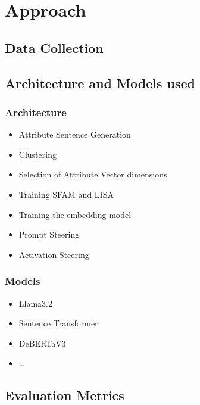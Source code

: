 \chapter{Approach}
\label{sec:approach}


\section{Data Collection}
\label{sec:approach:dataCollection}


\section{Architecture and Models used}
\label{sec:approach:architectureModels}

\subsection{Architecture}
\label{sec:approach:architectureModels:architecture}

\begin{itemize}
  \item Attribute Sentence Generation
  \item Clustering
  \item Selection of Attribute Vector dimensions
  \item Training SFAM and LISA
  \item Training the embedding model
  \item Prompt Steering
  \item Activation Steering
\end{itemize}

\subsection{Models}
\label{sec:approach:architectureModels:models}

\begin{itemize}
  \item Llama3.2
  \item Sentence Transformer
  \item DeBERTaV3
  \item \ldots
\end{itemize}


\section{Evaluation Metrics}
\label{sec:approach:evaluationMetrics}

